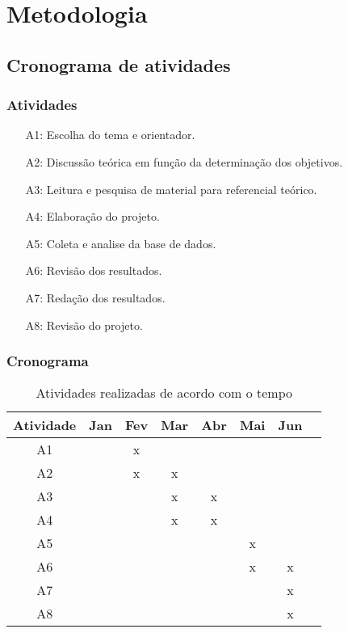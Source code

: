 

\chapter{Metodologia}\label{cap:metodologia}

\section{Cronograma de atividades}
\subsection{Atividades}
\begin{itemize}
	\item[A1:] Escolha do tema e orientador.
	\item[A2:] Discussão teórica em função da determinação dos objetivos.
	\item[A3:] Leitura e pesquisa de material para referencial teórico.
	\item[A4:] Elaboração do projeto.
	\item[A5:] Coleta e analise da base de dados.
	\item[A6:] Revisão dos resultados.
	\item[A7:] Redação dos resultados.
	\item[A8:] Revisão do projeto.
\end{itemize}

\subsection{Cronograma}

\begin{table}[h]
	\caption{Atividades realizadas de acordo com o tempo}
	\label{Tabela1}
	\begin{tabular}{|c | c | c | c | c | c | c | c |}
		\hline
		\rowcolor[HTML]{F8A102}
		\hline 
		Atividade &	Jan	& Fev & Mar & Abr & Mai & Jun \\
		\hline
		\rowcolor[HTML]{FFCE93} 
			A1 & & x & & & & \\
		\rowcolor[HTML]{FFCC67} 
			A2 & & x & x & & & \\
		\rowcolor[HTML]{FFCE93}
			A3 & & & x & x & & \\
		\rowcolor[HTML]{FFCC67} 	
			A4 & & & x & x & & \\
		\rowcolor[HTML]{FFCE93}
			A5 & &	& &	& x & \\
		\rowcolor[HTML]{FFCC67} 
			A6 & & & & & x & x \\
		\rowcolor[HTML]{FFCE93}
			A7 & & & & & & x \\
		\rowcolor[HTML]{FFCC67} 
			A8 & & & & & & x \\
		\hline
	\end{tabular}
\end{table}

